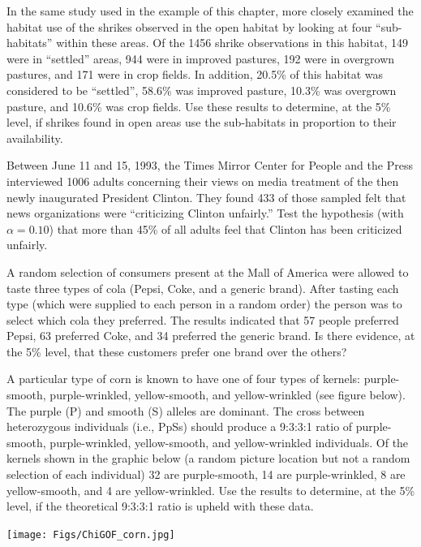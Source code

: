 \documentclass[10pt,openany]{book}\usepackage[]{graphicx}\usepackage[]{color}
\begin{document}
\newpage
\begin{exsection}
  \item \label{revex:ChiGOFShrike} In the same study used in the example of this chapter, \cite{BohallWood1987} more closely examined the habitat use of the shrikes observed in the open habitat by looking at four ``sub-habitats'' within these areas.  Of the 1456 shrike observations in this habitat, 149 were in ``settled'' areas, 944 were in improved pastures, 192 were in overgrown pastures, and 171 were in crop fields.  In addition, 20.5\% of this habitat was considered to be ``settled'', 58.6\% was improved pasture, 10.3\% was overgrown pasture, and 10.6\% was crop fields.    Use these results to determine, at the 5\% level, if shrikes found in open areas use the sub-habitats in proportion to their availability. 

  \item \label{revex:ChiGOFClinton} Between June 11 and 15, 1993, the Times Mirror Center for People and the Press interviewed 1006 adults concerning their views on media treatment of the then newly inaugurated President Clinton.  They found 433 of those sampled felt that news organizations were ``criticizing Clinton unfairly.''  Test the hypothesis (with $\alpha=0.10$) that more than 45\% of all adults feel that Clinton has been criticized unfairly. 

  \item \label{revex:ChiGOFPref2} A random selection of consumers present at the Mall of America were allowed to taste three types of cola (Pepsi, Coke, and a generic brand).  After tasting each type (which were supplied to each person in a random order) the person was to select which cola they preferred.  The results indicated that 57 people preferred Pepsi, 63 preferred Coke, and 34 preferred the generic brand.  Is there evidence, at the 5\% level, that these customers prefer one brand over the others? 

  \item \label{revex:ChiGOFMendels1} A particular type of corn is known to have one of four types of kernels: purple-smooth, purple-wrinkled, yellow-smooth, and yellow-wrinkled (see figure below).  The purple (P) and smooth (S) alleles are dominant.  The cross between heterozygous individuals (i.e., PpSs) should produce a 9:3:3:1 ratio of purple-smooth, purple-wrinkled, yellow-smooth, and yellow-wrinkled individuals.  Of the kernels shown in the graphic below (a random picture location but not a random selection of each individual) 32 are purple-smooth, 14 are purple-wrinkled, 8 are yellow-smooth, and 4 are yellow-wrinkled.  Use the results to determine, at the 5\% level, if the theoretical 9:3:3:1 ratio is upheld with these data. 
    \begin{center}
      \texttt{[image: Figs/ChiGOF\_corn.jpg]}
    \end{center}
\end{exsection}
\end{document}
